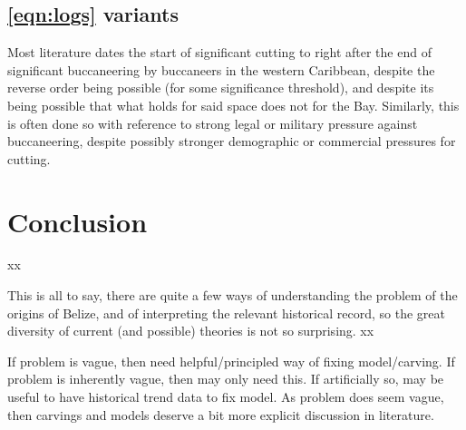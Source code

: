 	\subsection{\ref{eqn:logs} variants}
	\label{ss:possylogs}
		Most literature dates the start of significant cutting to right after the end of significant buccaneering by buccaneers in the western Caribbean, despite the reverse order being possible (for some significance threshold), and despite its being possible that what holds for said space does not for the Bay. Similarly, this is often done so with reference to strong legal or military pressure against buccaneering, despite possibly stronger demographic or commercial pressures for cutting. %
%
%
%
%
\section{Conclusion}
\label{s:concl}
	xx
	
	This is all to say, there are quite a few ways of understanding the problem of the origins of Belize, and of interpreting the relevant historical record, so the great diversity of current (and possible) theories is not so surprising. xx
	
	If problem is vague, then need helpful/principled way of fixing model/carving. If problem is inherently vague, then may only need this. If artificially so, may be useful to have historical trend data to fix model. As problem does seem vague, then carvings and models deserve a bit more explicit discussion in literature.
%
%
%
%
